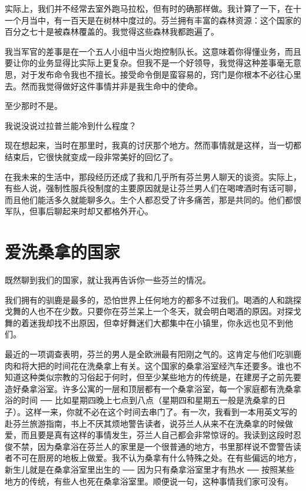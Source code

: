 实际上，我们并不经常去室外跑马拉松，但有时的确那样做。我计算了一下，在十一个月当中，有一百天是在树林中度过的。芬兰拥有丰富的森林资源：这个国家的百分之七十是被森林覆盖的。我觉得这些森林我都跑遍了。

我当军官的差事是在一个五人小组中当火炮控制队长。这意味着你得懂业务，而且要让你的业务显得比实际上更复杂。但我不是一个好领导，我觉得这种差事毫无意思，对于发布命令我也不擅长。接受命令倒是蛮容易的，窍门是你根本不必往心里去。然而我觉得做好这件事情并非是我生命中的使命。

至少那时不是。

我说没说过拉普兰能冷到什么程度？

现在想起来，当时在那里时，我真的讨厌那个地方。然而事情就是这样，当一切都结束后，它很快就变成一段非常美好的回忆了。

在我未来的生活中，那段经历还成了我和几乎所有芬兰男人聊天的谈资。实际上，有些人说，强制性服兵役制度的主要原因就是让芬兰男人们在喝啤酒时有话可聊，而且他们能活多久就能聊多久。生个人都忍受了许多痛苦，那是共同的。他们都恨军队，但事后聊起来时却又都格外开心。

 
\section{爱洗桑拿的国家}

既然聊到我们的国家，就让我再告诉你一些芬兰的情况。

我们拥有的驯鹿是最多的，恐怕世界上任何地方的都多不过我们。喝酒的人和跳探戈舞的人也不在少数。只要你在芬兰呆上一个冬天，就会明白喝酒的原因。对探戈舞的着迷我却找不出原因，但幸好舞迷们大都集中在小镇里，你永远也见不到他们。

最近的一项调查表明，芬兰的男人是全欧洲最有阳刚之气的。这肯定与他们吃驯鹿肉和将大把的时间花在洗桑拿上有关。这个国家的桑拿浴室经汽车还要多。谁也不知道这种类似宗教的习俗起于何时，但至少某些地方的传统是，在建房子之前先要造好桑拿浴室。许多公寓的一层和顶层都有一个桑拿浴室，每一个家庭都有洗桑拿浴的时间 ── 比如星期四晚上七点到八点（星期四和星期五一般是洗桑拿的日子）。这样一来，你就不必在这个时间去串门了。有一次，我看到一本用英文写的赴芬兰旅游指南，书上不厌其烦地警告读者，说芬兰人从来不在洗桑拿的时候做爱，而且要是真有这样的事情发生，芬兰人自己都会非常惊讶的。我读到这段时忍俊不禁，因为桑拿浴在芬兰人的家里是一个很普通的地方，书里那样说不啻警告读者不可在厨房的地板上做爱。我不认为桑拿有什么特殊之处。在有些偏远的地方，新生儿就是在桑拿浴室里出生的 ── 因为只有桑拿浴室里才有热水 ── 按照某些地方的传统，有些人也死在桑拿浴室里。顺便说一句，这种事情我们家可没有。

